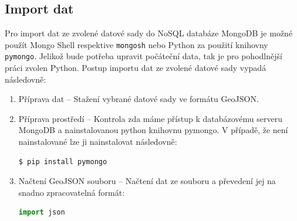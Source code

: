 \documentclass[a4paper, 11pt]{article}
\begin{document}
    \subsection{Import dat}
    Pro import dat ze zvolené datové sady do NoSQL databáze MongoDB je možné použít Mongo Shell respektive \texttt{mongosh} nebo Python za použití knihovny \texttt{pymongo}. Jelikož bude potřeba upravit počáteční data, tak je pro pohodlnější práci zvolen Python. Postup importu dat ze zvolené datové sady vypadá následovně:
    \begin{enumerate}
        \item Příprava dat -- Stažení vybrané datové sady ve formátu GeoJSON.
        \item Příprava prostředí -- Kontrola zda máme přístup k databázovému serveru MongoDB a nainstalovanou python knihovnu pymongo. V případě, že není nainstalované lze ji nainstalovat následovně:
        \begin{lstlisting}[style=NoSQL, language=SQL, framesep=10pt]
        $ pip install pymongo
        \end{lstlisting}
        \item Načtení GeoJSON souboru -- Načtení dat ze souboru a převedení jej na snadno zpracovatelná formát: 
        \begin{lstlisting}[style=Python, language=Python, framesep=10pt]
        import json
        

\end{lstlisting}
\end{enumerate}
\end{document}
